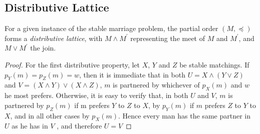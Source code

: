 \subsection{Distributive Lattice}

\begin{theorem}\label{thm_1_10}
    For a given instance of the stable marriage problem, the partial order $(M, \preceq)$ forms a \textit{distributive lattice}, with $M \wedge M^\prime$ representing the meet of $M$ and $M^\prime$, and $M \vee M^\prime$ the join.
\end{theorem}

\begin{proof}
    For the first distributive property, let $X$, $Y$ and $Z$ be stable matchings. If $p_Y(m) = p_Z(m) = w$, then it is immediate that in both $U  = X \wedge (Y \vee Z)$ and $V = (X \wedge Y ) \vee (X \wedge Z)$, $m$ is partnered by whichever of $p_X(m)$ and $w$ he most prefers. Otherwise, it is easy to verify that, in both $U$ and $V$, $m$ is partnered by $p_Z(m)$ if m prefers $Y$ to $Z$ to $X$, by $p_Y(m)$ if $m$ prefers $Z$ to $Y$ to $X$, and in all other cases by $p_X(m)$. Hence every man has the same partner in $U$ as he has in $V$ , and therefore $U = V$
    
\end{proof}
    